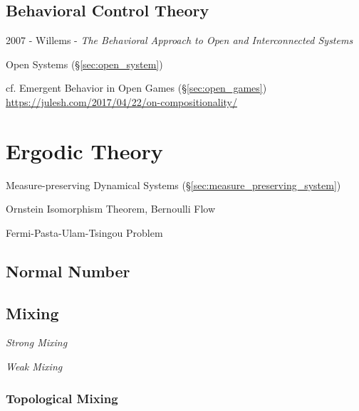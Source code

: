 \subsection{Behavioral Control Theory}\label{sec:behavioral_control}

2007 - Willems - \emph{The Behavioral Approach to Open and Interconnected
  Systems}

\fist Open Systems (\S\ref{sec:open_system})

\fist cf. Emergent Behavior in Open Games (\S\ref{sec:open_games})
\url{https://julesh.com/2017/04/22/on-compositionality/}



\section{Ergodic Theory}\label{sec:ergodic_theory}

\fist Measure-preserving Dynamical Systems
(\S\ref{sec:measure_preserving_system})

Ornstein Isomorphism Theorem, Bernoulli Flow

Fermi-Pasta-Ulam-Tsingou Problem



\subsection{Normal Number}\label{sec:normal_number}

\subsection{Mixing}\label{sec:mixing}

\emph{Strong Mixing}

\emph{Weak Mixing}



\subsubsection{Topological Mixing}\label{sec:topological_mixing}



